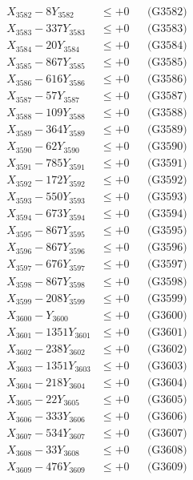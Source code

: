 \documentclass[a4paper,10pt]{article}
\begin{document}
{\begin{align}
X_{3582} - 8Y_{3582} &\leq +0 && \text{(G3582)} \\
X_{3583} - 337Y_{3583} &\leq +0 && \text{(G3583)} \\
X_{3584} - 20Y_{3584} &\leq +0 && \text{(G3584)} \\
X_{3585} - 867Y_{3585} &\leq +0 && \text{(G3585)} \\
X_{3586} - 616Y_{3586} &\leq +0 && \text{(G3586)} \\
X_{3587} - 57Y_{3587} &\leq +0 && \text{(G3587)} \\
X_{3588} - 109Y_{3588} &\leq +0 && \text{(G3588)} \\
X_{3589} - 364Y_{3589} &\leq +0 && \text{(G3589)} \\
X_{3590} - 62Y_{3590} &\leq +0 && \text{(G3590)} \\
\allowbreak
X_{3591} - 785Y_{3591} &\leq +0 && \text{(G3591)} \\
X_{3592} - 172Y_{3592} &\leq +0 && \text{(G3592)} \\
X_{3593} - 550Y_{3593} &\leq +0 && \text{(G3593)} \\
X_{3594} - 673Y_{3594} &\leq +0 && \text{(G3594)} \\
X_{3595} - 867Y_{3595} &\leq +0 && \text{(G3595)} \\
X_{3596} - 867Y_{3596} &\leq +0 && \text{(G3596)} \\
X_{3597} - 676Y_{3597} &\leq +0 && \text{(G3597)} \\
X_{3598} - 867Y_{3598} &\leq +0 && \text{(G3598)} \\
X_{3599} - 208Y_{3599} &\leq +0 && \text{(G3599)} \\
X_{3600} - Y_{3600} &\leq +0 && \text{(G3600)} \\
\allowbreak
X_{3601} - 1351Y_{3601} &\leq +0 && \text{(G3601)} \\
X_{3602} - 238Y_{3602} &\leq +0 && \text{(G3602)} \\
X_{3603} - 1351Y_{3603} &\leq +0 && \text{(G3603)} \\
X_{3604} - 218Y_{3604} &\leq +0 && \text{(G3604)} \\
X_{3605} - 22Y_{3605} &\leq +0 && \text{(G3605)} \\
X_{3606} - 333Y_{3606} &\leq +0 && \text{(G3606)} \\
X_{3607} - 534Y_{3607} &\leq +0 && \text{(G3607)} \\
X_{3608} - 33Y_{3608} &\leq +0 && \text{(G3608)} \\
X_{3609} - 476Y_{3609} &\leq +0 && \text{(G3609)} \\

\end{align}}
\end{document}
